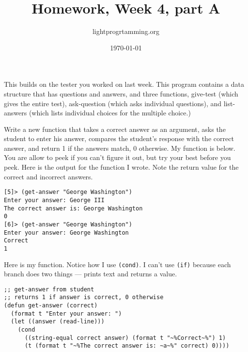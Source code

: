 \documentclass{article}
\title{Homework, Week 4, part A}
\author{lightprogrtamming.org}
\date{\today}
\begin{document}
\maketitle{}

This builds on the tester you worked on last week. This program contains a data structure that has questions and answers, and three functions, give-test (which gives the entire test), ask-question (which asks individual questions), and list-answers (which lists individual choices for the multiple choice.)

Write a new function that takes a correct answer as an argument, asks the student to enter his answer, compares the student's response with the correct answer, and return 1 if the answers match, 0 otherwise. My function is below. You are allow to peek if you can't figure it out, but try your best before you peek.  Here is the output for the function I wrote. Note the return value for the correct and incorrect answers.

\lstset{language=Lisp,numbers=left,keepspaces=false,basicstyle=\small,numberstyle=\tiny,breaklines=true,showstringspaces=false}
\begin{lstlisting}
[5]> (get-answer "George Washington")
Enter your answer: George III
The correct answer is: George Washington
0
[6]> (get-answer "George Washington")
Enter your answer: George Washington
Correct
1
\end{lstlisting}

Here is my function. Notice how I use \texttt{(cond)}. I can't use \texttt{(if)} because each branch does two things --- prints text and returns a value.

\lstset{language=Lisp,numbers=left,keepspaces=false,basicstyle=\small,numberstyle=\tiny,breaklines=true,showstringspaces=false}
\begin{lstlisting}
;; get-answer from student
;; returns 1 if answer is correct, 0 otherwise
(defun get-answer (correct)
  (format t "Enter your answer: ")
  (let ((answer (read-line)))
    (cond 
      ((string-equal correct answer) (format t "~%Correct~%") 1)
      (t (format t "~%The correct answer is: ~a~%" correct) 0))))
\end{lstlisting}
\end{document}
